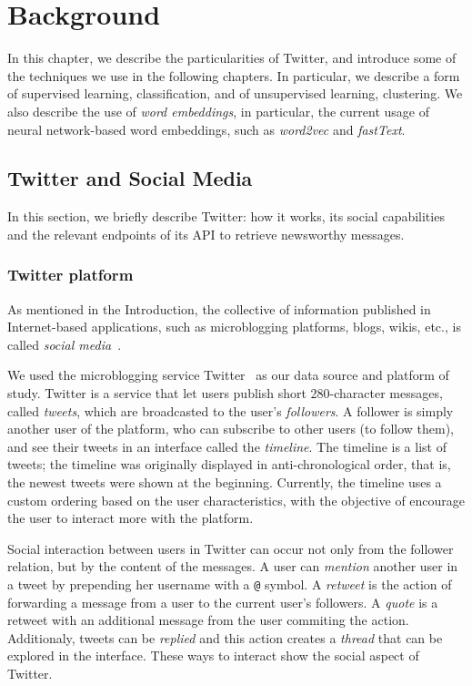 
\chapter{Background}
\label{chapter:background}

In this chapter, we describe the particularities of Twitter, and introduce some
of the techniques we use in the following chapters. 
%
In particular, we describe a form of supervised learning, classification, and of
unsupervised learning, clustering.
%
We also describe the use of {\em word embeddings}, in particular, the current
usage of neural network-based word embeddings, such as {\em word2vec} and {\em
fastText}.

\section{Twitter and Social Media}

In this section, we briefly describe Twitter: how it works, its social
capabilities and the relevant endpoints of its API to retrieve newsworthy
messages.

\subsection*{Twitter platform}

As mentioned in the Introduction, the collective of information published in
Internet-based applications, such as microblogging platforms, blogs, wikis,
etc., is called {\em social media}~\cite{kaplan2010users}.


We used the microblogging service Twitter~\cite{twitter} as our data source and
platform of study.
%
Twitter is a service that let users publish short 280-character messages, called
{\em tweets}, which are broadcasted to the user's {\em followers}.
%
A follower is simply another user of the platform, who can subscribe to other
users (to follow them), and see their tweets in an interface called the {\em
timeline}.
%
The timeline is a list of tweets; the timeline was originally displayed in
anti-chronological order, that is, the newest tweets were shown at the
beginning.
%
Currently, the timeline uses a custom ordering based on the user
characteristics, with the objective of encourage the user to interact more with
the platform.

Social interaction between users in Twitter can occur not only from the follower
relation, but by the content of the messages.
%
A user can {\em mention} another user in a tweet by prepending her username with
a {\tt @} symbol.
%
A {\em retweet} is the action of forwarding a message from a user to the current
user's followers.
%
A {\em quote} is a retweet with an additional message from the user commiting
the action.
%
Additionaly, tweets can be {\em replied} and this action creates a {\em thread}
that can be explored in the interface.
%
These ways to interact show the social aspect of Twitter.

